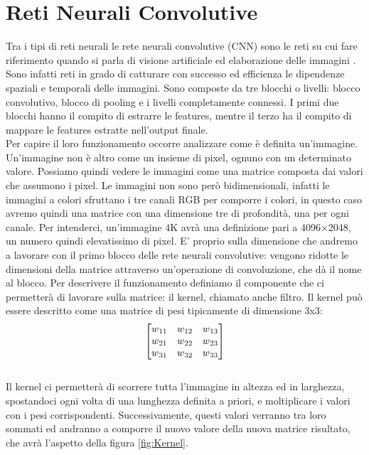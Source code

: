 \section{Reti Neurali Convolutive}
Tra i tipi di reti neurali le rete neurali convolutive (CNN) sono le reti su cui fare riferimento quando si parla di visione artificiale ed elaborazione delle immagini \cite{yamashita2018convolutional}. Sono infatti reti in grado di catturare con successo ed efficienza le dipendenze spaziali e temporali delle immagini. Sono composte da tre blocchi o livelli: blocco convolutivo, blocco di pooling e i livelli completamente connessi. I primi due blocchi hanno il compito di estrarre le features, mentre il terzo ha il compito di mappare le features estratte nell'output finale. 
\\Per capire il loro funzionamento occorre analizzare come è definita un'immagine. Un'immagine non è altro come un insieme di pixel, ognuno con un determinato valore. Possiamo quindi vedere le immagini come una  matrice composta dai valori che assumono i pixel. Le immagini non sono però bidimensionali, infatti le immagini a colori sfruttano i tre canali RGB per comporre i colori, in questo caso avremo quindi una matrice con una dimensione tre di profondità, una per ogni canale. Per intenderci, un'immagine 4K avrà una definizione pari a 4096×2048, un numero quindi elevatissimo di pixel. E' proprio sulla dimensione che andremo a lavorare con il primo blocco delle rete neurali convolutive: vengono ridotte le dimensioni della matrice attraverso un'operazione di convoluzione, che dà il nome al blocco. Per descrivere il funzionamento definiamo il componente che ci permetterà di lavorare sulla matrice: il kernel, chiamato anche filtro. Il kernel può essere descritto come una matrice di pesi tipicamente di dimensione 3x3:
$$\begin{bmatrix}
w\textsubscript{11} & w\textsubscript{12} & w\textsubscript{13}\\
w\textsubscript{21} & w\textsubscript{22} & w\textsubscript{23}\\
w\textsubscript{31} & w\textsubscript{32} & w\textsubscript{33}
\end{bmatrix}$$
\\Il kernel ci permetterà di scorrere tutta l'immagine in altezza ed in larghezza, spostandoci ogni volta di una lunghezza definita a priori, e moltiplicare i valori con i pesi corrispondenti. Successivamente, questi valori verranno tra loro sommati ed andranno a comporre il nuovo valore della nuova matrice risultato, che avrà l'aspetto della figura \ref{fig:Kernel}.

